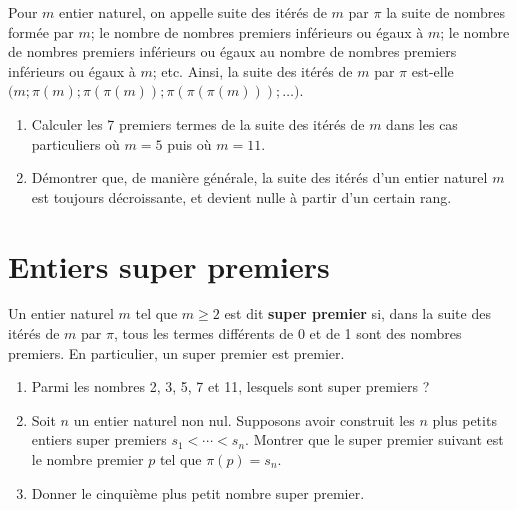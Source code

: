 Pour \( m \) entier naturel, on appelle suite des itérés de \( m \) par \( \pi \) la suite de nombres formée par \( m \); le nombre de nombres premiers inférieurs ou égaux à \( m \); le nombre de nombres premiers inférieurs ou égaux au nombre de nombres premiers inférieurs ou égaux à \( m \); etc. Ainsi, la suite des itérés de \( m \) par \( \pi \) est-elle \( \bigl( m; \pi(m); \pi(\pi(m)); \pi(\pi(\pi(m))); \dots \bigr) \).

\begin{enumerate}
\item Calculer les 7 premiers termes de la suite des itérés de \( m \) dans les cas particuliers où \( m = 5 \) puis où \( m = 11 \).
\item Démontrer que, de manière générale, la suite des itérés d’un entier naturel \( m \) est toujours décroissante, et devient nulle à partir d’un certain rang.
\end{enumerate}

\section*{Entiers super premiers}

Un entier naturel \( m \) tel que \( m \geqslant 2 \) est dit \textbf{super premier} si, dans la suite des itérés de \( m \) par \( \pi \), tous les termes différents de 0 et de 1 sont des nombres premiers. En particulier, un super premier est premier.

\begin{enumerate}
\item Parmi les nombres 2, 3, 5, 7 et 11, lesquels sont super premiers ?
\item Soit \( n \) un entier naturel non nul. Supposons avoir construit les \( n \) plus petits entiers super premiers \( s_1 < \cdots < s_n \). Montrer que le super premier suivant est le nombre premier \( p \) tel que \( \pi(p) = s_n \).
\item Donner le cinquième plus petit nombre super premier.
\end{enumerate}
